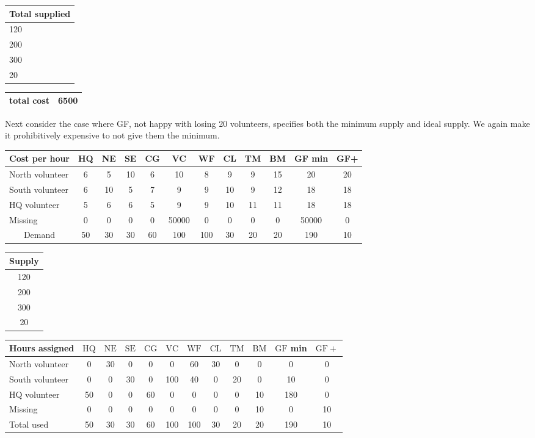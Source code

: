 \documentclass[10pt]{article}
\begin{document}
\begin{tabular}{|l|}
\hline
Total supplied \\
\hline
120 \\
\hline
200 \\
\hline
300 \\
\hline
20 \\
\hline
\end{tabular}

\begin{tabular}{|l|l|}
\hline
total cost & 6500 \\
\hline
\end{tabular}

Next consider the case where GF, not happy with losing 20 volunteers, specifies both the minimum supply and ideal supply. We again make it prohibitively expensive to not give them the minimum.

\begin{tabular}{|l|c|c|c|c|c|c|c|c|c|c|c|}
\hline
Cost per hour & HQ & NE & SE & CG & VC & WF & CL & TM & BM & GF min & GF+ \\
\hline
North volunteer & 6 & 5 & 10 & 6 & 10 & 8 & 9 & 9 & 15 & 20 & 20 \\
\hline
South volunteer & 6 & 10 & 5 & 7 & 9 & 9 & 10 & 9 & 12 & 18 & 18 \\
\hline
HQ volunteer & 5 & 6 & 6 & 5 & 9 & 9 & 10 & 11 & 11 & 18 & 18 \\
\hline
Missing & 0 & 0 & 0 & 0 & 50000 & 0 & 0 & 0 & 0 & 50000 & 0 \\
\hline
\multicolumn{1}{|c|}{Demand} & 50 & 30 & 30 & 60 & 100 & 100 & 30 & 20 & 20 & 190 & 10 \\
\hline
\end{tabular}

\begin{tabular}{|c|}
\hline
Supply \\
\hline
120 \\
\hline
200 \\
\hline
300 \\
\hline
20 \\
\hline
\end{tabular}

\begin{tabular}{|l|c|c|c|c|c|c|c|c|c|c|c|}
\hline
Hours assigned & $\mathrm{HQ}$ & $\mathrm{NE}$ & $\mathrm{SE}$ & $\mathrm{CG}$ & $\mathrm{VC}$ & $\mathrm{WF}$ & $\mathrm{CL}$ & $\mathrm{TM}$ & $\mathrm{BM}$ & $\mathrm{GF}$ min & $\mathrm{GF}+$ \\
\hline
North volunteer & 0 & 30 & 0 & 0 & 0 & 60 & 30 & 0 & 0 & 0 & 0 \\
\hline
South volunteer & 0 & 0 & 30 & 0 & 100 & 40 & 0 & 20 & 0 & 10 & 0 \\
\hline
HQ volunteer & 50 & 0 & 0 & 60 & 0 & 0 & 0 & 0 & 10 & 180 & 0 \\
\hline
Missing & 0 & 0 & 0 & 0 & 0 & 0 & 0 & 0 & 10 & 0 & 10 \\
\hline
Total used & 50 & 30 & 30 & 60 & 100 & 100 & 30 & 20 & 20 & 190 & 10 \\
\hline
\end{tabular}
\end{document}
